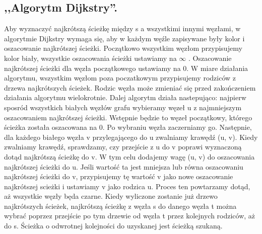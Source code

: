 \documentclass[11pt]{article} %
\begin{document}
\subsection{ ,,Algorytm Dijkstry''.}


Aby wyznaczyć najkrótszą ścieżkę między s a wszystkimi innymi węzłami, w algorytmie Dijkstry wymaga się, aby w każdym węźle zapisywane były kolor i oszacowanie najkrótszej ścieżki. Początkowo wszystkim węzłom przypisujemy kolor biały, wszystkie oszacowania ścieżki ustawiamy na $\infty$ . Oszacowanie najkrótszej ścieżki dla węzła początkowego ustawiamy na 0.
W miare działania algorytmu, wszystkim węzłom poza poczatkowym przypisujemy rodziców z drzewa najkrótszych ścieżek. Rodzic węzła może zmieniać się przed zakończeniem działania algorytmu wielokrotnie.
Dalej algorytm działa nastepująco: najpierw sposród wszystkich białych węzłów grafu wybieramy węzeł u z najmniejszym oszacowaniem najkrótszej ścieżki. Wstępnie będzie to węzeł początkowy, którego ścieżka została oszacowana na 0. Po wybraniu węzła zaczerniamy go. Następnie, dla każdego białego węzła v przylegającego do u zwalniamy krawędź (u, v). Kiedy zwalniamy krawędź, sprawdzamy, czy przejście z u do v poprawi wyznaczoną dotąd najkrótszą ścieżkę do v. W tym celu dodajemy wagę (u, v) do oszacowania najkrótszej ścieżki do u. Jeśli wartość ta jest mniejsza lub równa oszacowaniu najkrótszej ścieżki do v, przypisujemy tę wartość v jako nowe oszacowanie najkrótszej scieżki i ustawiamy v jako rodzica u. Proces ten powtarzamy dotąd, aż wszystkie węzły będa czarne. Kiedy wyliczone zostanie już drzewo najkrótszych ścieżek, najkrótszą ścieżkę z węzła s do danego węzła t można wybrać poprzez przejście po tym drzewie od węzła t przez kolejnych rodziców, aż do s. Ścieżka o odwrotnej kolejności do uzyskanej jest ścieżką szukaną. 
\end{document}
